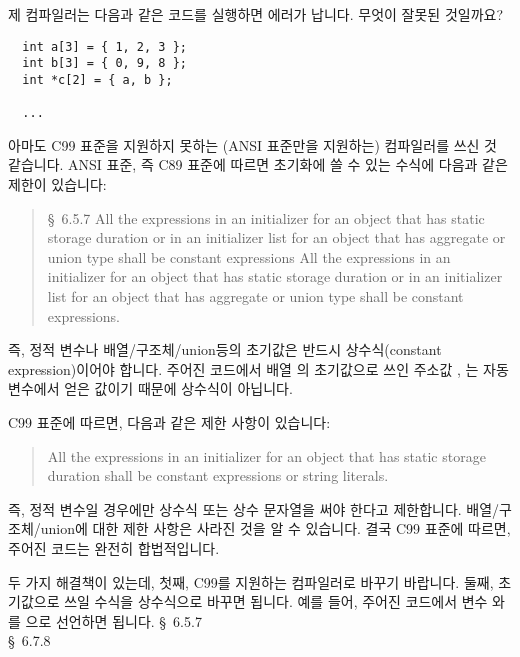 \begin{faq}
	제 컴파일러는 다음과 같은 코드를 실행하면 에러가 납니다. 무엇이 잘못된 것일까요?

\begin{verbatim}
  int a[3] = { 1, 2, 3 };
  int b[3] = { 0, 9, 8 };
  int *c[2] = { a, b };

  ...
\end{verbatim}

\A
	아마도 C99 표준을 지원하지 못하는 (ANSI 표준만을 지원하는) 컴파일러를
        쓰신 것 같습니다. ANSI 표준, 즉 C89 표준에 따르면 초기화에 쓸 수 있는
        수식에 다음과 같은 제한이 있습니다:

\begin{quote}
  \S\ 6.5.7 All the expressions in an initializer for an object that has
  static storage duration or in an initializer list for an object that has
  aggregate or union type shall be constant expressions All the expressions in
  an initializer for an object that has static storage duration or in an
  initializer list for an object that has aggregate or union type shall be
  constant expressions.
\end{quote}

	즉, 정적 변수나 배열/구조체/union등의 초기값은 반드시 상수식(constant
        expression)이어야 합니다.  주어진 코드에서 배열 의 초기값으로
        쓰인 주소값 , 는 자동 변수에서 얻은 값이기 때문에 상수식이
        아닙니다.

        C99 표준에 따르면, 다음과 같은 제한 사항이 있습니다:

\begin{quote}
  All the expressions in an initializer for an object that has static
  storage duration shall be constant expressions or string literals. 
\end{quote}

	즉, 정적 변수일 경우에만 상수식 또는 상수 문자열을 써야 한다고 제한합니다.
        배열/구조체/union에 대한 제한 사항은 사라진 것을 알 수 있습니다. 결국 C99
        표준에 따르면, 주어진 코드는 완전히 합법적입니다.

        두 가지 해결책이 있는데, 첫째, C99를 지원하는 컴파일러로 바꾸기 바랍니다.
        둘째, 초기값으로 쓰일 수식을 상수식으로 바꾸면 됩니다. 예를 들어, 주어진 코드에서
        변수 와 를 으로 선언하면 됩니다.
\R
	\cite{c89} \S\ 6.5.7 \\
        \cite{c99} \S\ 6.7.8
\end{faq}


